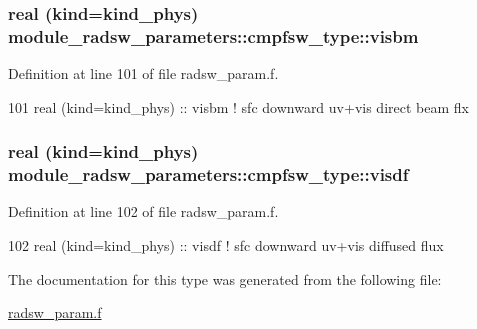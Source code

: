 \subsubsection[{\texorpdfstring{visbm}{visbm}}]{\setlength{\rightskip}{0pt plus 5cm}real (kind=kind\+\_\+phys) module\+\_\+radsw\+\_\+parameters\+::cmpfsw\+\_\+type\+::visbm}\hypertarget{structmodule__radsw__parameters_1_1cmpfsw__type_aabfae10580f53c63900c74261b1b219c}{}\label{structmodule__radsw__parameters_1_1cmpfsw__type_aabfae10580f53c63900c74261b1b219c}


Definition at line 101 of file radsw\+\_\+param.\+f.


\begin{DoxyCode}
101         \textcolor{keywordtype}{real (kind=kind\_phys)} :: visbm         \textcolor{comment}{! sfc downward uv+vis direct beam flx}
\end{DoxyCode}
\subsubsection[{\texorpdfstring{visdf}{visdf}}]{\setlength{\rightskip}{0pt plus 5cm}real (kind=kind\+\_\+phys) module\+\_\+radsw\+\_\+parameters\+::cmpfsw\+\_\+type\+::visdf}\hypertarget{structmodule__radsw__parameters_1_1cmpfsw__type_a3eb91eab30abc0f1f1bb05c5447cede5}{}\label{structmodule__radsw__parameters_1_1cmpfsw__type_a3eb91eab30abc0f1f1bb05c5447cede5}


Definition at line 102 of file radsw\+\_\+param.\+f.


\begin{DoxyCode}
102         \textcolor{keywordtype}{real (kind=kind\_phys)} :: visdf         \textcolor{comment}{! sfc downward uv+vis diffused flux}
\end{DoxyCode}


The documentation for this type was generated from the following file\+:\begin{DoxyCompactItemize}
\item 
\hyperlink{radsw__param_8f}{radsw\+\_\+param.\+f}\end{DoxyCompactItemize}
